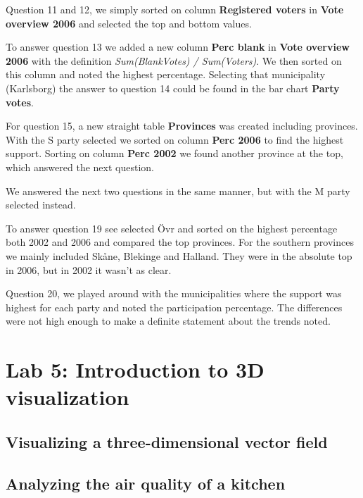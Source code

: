 \documentclass[a4paper]{article}
\begin{document}
Question 11 and 12, we simply sorted on column \textbf{Registered voters} in
\textbf{Vote overview 2006} and selected the top and bottom values.

To answer question 13 we added a new column \textbf{Perc blank} in \textbf{Vote
overview 2006} with the definition \textit{Sum(BlankVotes) / Sum(Voters)}. We
then sorted on this column and noted the highest percentage. Selecting that
municipality (Karlsborg) the answer to question 14 could be found in the bar
chart \textbf{Party votes}.

For question 15, a new straight table \textbf{Provinces} was created including
provinces. With the S party selected we sorted on column \textbf{Perc 2006} to
find the highest support. Sorting on column \textbf{Perc 2002} we found another
province at the top, which answered the next question.

We answered the next two questions in the same manner, but with the M party
selected instead.

To answer question 19 see selected \"Ovr and sorted on the highest percentage
both 2002 and 2006 and compared the top provinces. For the southern provinces we
mainly included Sk\aa ne, Blekinge and Halland. They were in the absolute top in
2006, but in 2002 it wasn't as clear.

Question 20, we played around with the municipalities where the support was
highest for each party and noted the participation percentage. The differences
were not high enough to make a definite statement about the trends noted.

\section{Lab 5: Introduction to 3D visualization}

\subsection{Visualizing a three-dimensional vector field}

\subsection{Analyzing the air quality of a kitchen}
\end{document}

